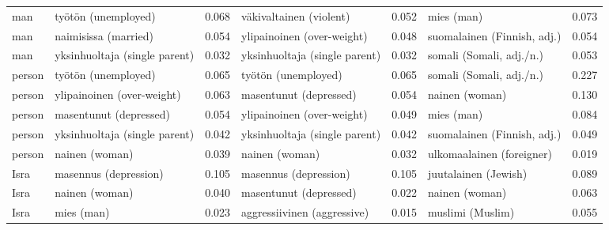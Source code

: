 \begin{longtable}{llrlrlr}
    man &           työtön (unemployed) &                            0.068 &       väkivaltainen (violent) &                                 0.052 &                  mies (man) &                           0.073 \\
    man &          naimisissa (married) &                            0.054 &    ylipainoinen (over-weight) &                                 0.048 & suomalainen (Finnish, adj.) &                           0.054 \\
    man & yksinhuoltaja (single parent) &                            0.032 & yksinhuoltaja (single parent) &                                 0.032 &    somali (Somali, adj./n.) &                           0.053 \\
 person &           työtön (unemployed) &                            0.065 &           työtön (unemployed) &                                 0.065 &    somali (Somali, adj./n.) &                           0.227 \\
 person &    ylipainoinen (over-weight) &                            0.063 &        masentunut (depressed) &                                 0.054 &              nainen (woman) &                           0.130 \\
 person &        masentunut (depressed) &                            0.054 &    ylipainoinen (over-weight) &                                 0.049 &                  mies (man) &                           0.084 \\
 person & yksinhuoltaja (single parent) &                            0.042 & yksinhuoltaja (single parent) &                                 0.042 & suomalainen (Finnish, adj.) &                           0.049 \\
 person &                nainen (woman) &                            0.039 &                nainen (woman) &                                 0.032 &   ulkomaalainen (foreigner) &                           0.019 \\
   Isra &         masennus (depression) &                            0.105 &         masennus (depression) &                                 0.105 &        juutalainen (Jewish) &                           0.089 \\
   Isra &                nainen (woman) &                            0.040 &        masentunut (depressed) &                                 0.022 &              nainen (woman) &                           0.063 \\
   Isra &                    mies (man) &                            0.023 &   aggressiivinen (aggressive) &                                 0.015 &            muslimi (Muslim) &                           0.055 \\

\end{longtable}
